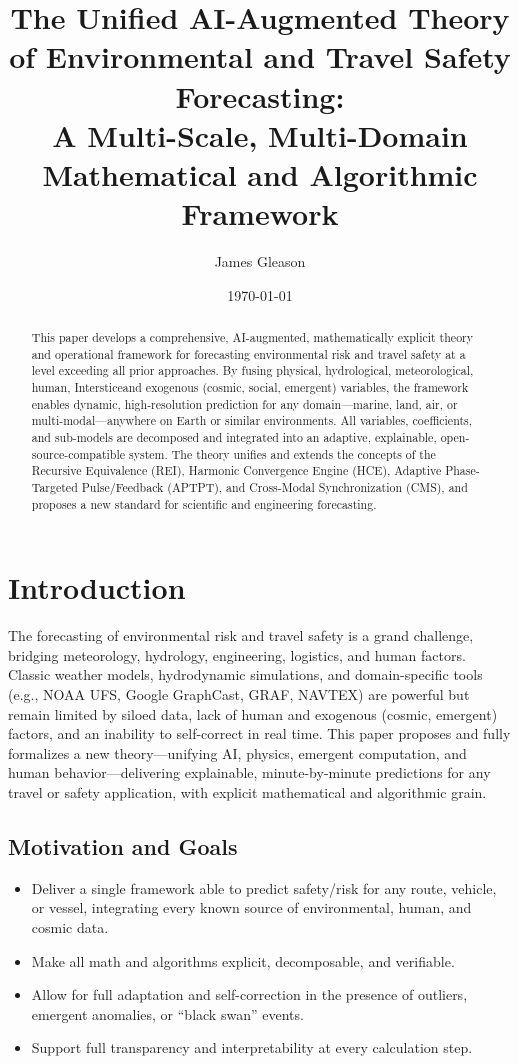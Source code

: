 \documentclass[12pt]{article}
\title{\textbf{The Unified AI-Augmented Theory of Environmental and Travel Safety Forecasting: \\A Multi-Scale, Multi-Domain Mathematical and Algorithmic Framework}}
\author{James Gleason}
\date{\today}
\begin{document}
\maketitle

\begin{abstract}
This paper develops a comprehensive, AI-augmented, mathematically explicit theory and operational framework for forecasting environmental risk and travel safety at a level exceeding all prior approaches. By fusing physical, hydrological, meteorological, human, Intersticeand exogenous (cosmic, social, emergent) variables, the framework enables dynamic, high-resolution prediction for any domain—marine, land, air, or multi-modal—anywhere on Earth or similar environments. All variables, coefficients, and sub-models are decomposed and integrated into an adaptive, explainable, open-source-compatible system. The theory unifies and extends the concepts of the Recursive Equivalence  (REI), Harmonic Convergence Engine (HCE), Adaptive Phase-Targeted Pulse/Feedback (APTPT), and Cross-Modal Synchronization (CMS), and proposes a new standard for scientific and engineering forecasting.

\end{abstract}

\tableofcontents

\section{Introduction}

The forecasting of environmental risk and travel safety is a grand challenge, bridging meteorology, hydrology, engineering, logistics, and human factors. Classic weather models, hydrodynamic simulations, and domain-specific tools (e.g., NOAA UFS, Google GraphCast, GRAF, NAVTEX) are powerful but remain limited by siloed data, lack of human and exogenous (cosmic, emergent) factors, and an inability to self-correct in real time. This paper proposes and fully formalizes a new theory—unifying AI, physics, emergent computation, and human behavior—delivering explainable, minute-by-minute predictions for any travel or safety application, with explicit mathematical and algorithmic grain.

\subsection{Motivation and Goals}
\begin{itemize}
\item Deliver a single framework able to predict safety/risk for any route, vehicle, or vessel, integrating every known source of environmental, human, and cosmic data.
\item Make all math and algorithms explicit, decomposable, and verifiable.
\item Allow for full adaptation and self-correction in the presence of outliers, emergent anomalies, or “black swan” events.
\item Support full transparency and interpretability at every calculation step.
\end{itemize}
\end{document}
